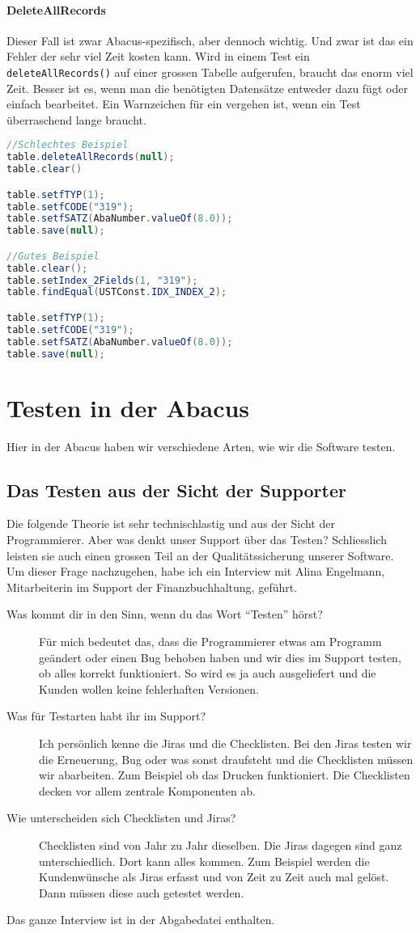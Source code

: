 \paragraph{DeleteAllRecords}
Dieser Fall ist zwar Abacus-spezifisch, aber dennoch wichtig. Und zwar ist das ein Fehler der sehr viel Zeit kosten kann. Wird in einem Test ein \texttt{deleteAllRecords()} auf einer grossen Tabelle aufgerufen, braucht das enorm viel Zeit. Besser ist es, wenn man die benötigten Datensätze entweder dazu fügt oder einfach bearbeitet. Ein Warnzeichen für ein vergehen ist, wenn ein Test überraschend lange braucht. \cite{web:abawikijunit5}
\begin{lstlisting}[language=Java, caption={}]
//Schlechtes Beispiel
table.deleteAllRecords(null);
table.clear()

table.setfTYP(1);
table.setfCODE("319");
table.setfSATZ(AbaNumber.valueOf(8.0));
table.save(null);

//Gutes Beispiel
table.clear();
table.setIndex_2Fields(1, "319");
table.findEqual(USTConst.IDX_INDEX_2);

table.setfTYP(1);
table.setfCODE("319");
table.setfSATZ(AbaNumber.valueOf(8.0));
table.save(null);
\end{lstlisting}

\section{Testen in der Abacus} \label{Testen in der Abacus}
Hier in der Abacus haben wir verschiedene Arten, wie wir die Software testen.
\subsection{Das Testen aus der Sicht der Supporter}
Die folgende Theorie ist sehr technischlastig und aus der Sicht der Programmierer. Aber was denkt unser Support über das Testen? Schliesslich leisten sie auch einen grossen Teil an der Qualitätssicherung unserer Software. Um dieser Frage nachzugehen, habe ich ein Interview mit Alina Engelmann, Mitarbeiterin im Support der Finanzbuchhaltung, geführt.
\begin{description}
\item[Was kommt dir in den Sinn, wenn du das Wort \enquote{Testen} hörst?] Für mich bedeutet das, dass die Programmierer etwas am Programm geändert oder einen Bug behoben haben und wir dies im Support testen, ob alles korrekt funktioniert. So wird es ja auch ausgeliefert und die Kunden wollen keine fehlerhaften Versionen.
\item[Was für Testarten habt ihr im Support?] Ich persönlich kenne die Jiras und die Checklisten. Bei den Jiras testen wir die Erneuerung, Bug oder was sonst draufsteht und die Checklisten müssen wir abarbeiten. Zum Beispiel ob das Drucken funktioniert. Die Checklisten decken vor allem zentrale Komponenten ab.
\item[Wie unterscheiden sich Checklisten und Jiras?] Checklisten sind von Jahr zu Jahr dieselben. Die Jiras dagegen sind ganz unterschiedlich. Dort kann alles kommen. Zum Beispiel werden die Kundenwünsche als Jiras erfasst und von Zeit zu Zeit auch mal gelöst. Dann müssen diese auch getestet werden.
\end{description}
Das ganze Interview ist in der Abgabedatei enthalten.
